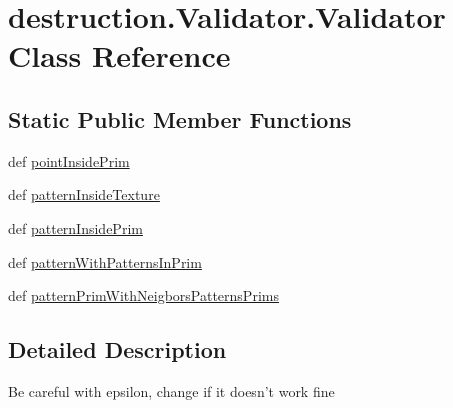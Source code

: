 \hypertarget{classdestruction_1_1_validator_1_1_validator}{\section{destruction.\-Validator.\-Validator Class Reference}
\label{classdestruction_1_1_validator_1_1_validator}
}
\subsection*{Static Public Member Functions}
\begin{DoxyCompactItemize}
\item 
def \hyperlink{classdestruction_1_1_validator_1_1_validator_a67d5986e3a8fe9cc9cae368e6c6ce6d8}{point\-Inside\-Prim}
\item 
def \hyperlink{classdestruction_1_1_validator_1_1_validator_adb05c16d349895c7f60fe45f7a4e45d9}{pattern\-Inside\-Texture}
\item 
def \hyperlink{classdestruction_1_1_validator_1_1_validator_a209790a3dcc06705ab2f34375d21b7b5}{pattern\-Inside\-Prim}
\item 
def \hyperlink{classdestruction_1_1_validator_1_1_validator_aa73443f668ad932ad83562cfa0749ddc}{pattern\-With\-Patterns\-In\-Prim}
\item 
def \hyperlink{classdestruction_1_1_validator_1_1_validator_a2a1f6a0771b17b976f7feed9d25b9215}{pattern\-Prim\-With\-Neigbors\-Patterns\-Prims}
\end{DoxyCompactItemize}


\subsection{Detailed Description}
\begin{DoxyVerb}Be careful with epsilon, change if it doesn't work fine
\end{DoxyVerb}
 

